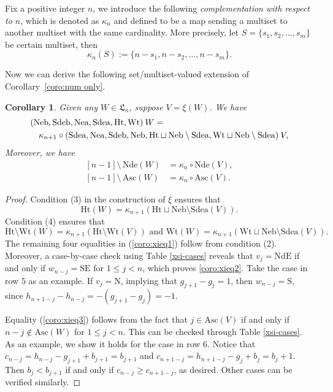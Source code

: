 \documentclass[12pt]{amsart}
\numberwithin{equation}{section}
\theoremstyle{plain}
\newtheorem{corollary}[theorem]{Corollary}
\theoremstyle{definition}
\def\LH{\mathfrak{L}}
\def\N{\mathrm{N}}
\def\S{\mathrm{S}}
\def\SE{\mathrm{SE}}
\def\NdE{\mathrm{NdE}}
\def\Neb{\mathrm{Neb}}
\def\Nea{\mathrm{Nea}}
\def\Sdeb{\mathrm{Sdeb}}
\def\Sdea{\mathrm{Sdea}}
\def\Nde{\mathrm{Nde}}
\def\Het{\mathrm{Ht}}
\def\Wt{\mathrm{Wt}}
\def\Asc{\mathrm{Asc}}
\begin{document}
Fix a positive integer $n$, we introduce the following {\em complementation with respect to $n$}, which is denoted as $\kappa_n$ and defined to be a map sending a multiset to another multiset with the same cardinality. More precisely, let $S=\{s_1,s_2,\ldots,s_m\}$ be certain multiset, then $$\kappa_n(S):=\{n-s_1,n-s_2,\ldots,n-s_m\}.$$

Now we can derive the following set/multiset-valued extension of Corollary~\ref{coro:num only}.

\begin{corollary}\label{coro:xi-stats}
Given any $W\in\LH_n$, suppose $V=\xi(W)$. We have
\begin{align}
&(\Neb,\Sdeb,\Nea,\Sdea,\Het,\Wt)\:W = \notag\\
& \quad \kappa_{n+1}\circ(\Sdea,\Nea,\Sdeb,\Neb,\Het\sqcup\Neb\setminus\Sdea,\Wt\sqcup\Neb\setminus\Sdea)\:V,
\label{coro:xieq1}
\end{align}
Moreover, we have
\begin{align}
\label{coro:xieq2}
[n-1] \setminus \,\Nde(W) &= \kappa_n\circ\Nde(V),\\
\label{coro:xieq3}
[n-1] \setminus \,\Asc(W) &= \kappa_n\circ\Asc(V).
\end{align}
\end{corollary}
\begin{proof}
Condition (3) in the construction of $\xi$ ensures that
$$\Het(W)=\kappa_{n+1}(\Het\sqcup\Neb\setminus\Sdea(V)).$$
Condition (4) ensures that
$$\Het\setminus\Wt(W)=\kappa_{n+1}(\Het\setminus\Wt(V)) \text{ and } \Wt(W)=\kappa_{n+1}(\Wt\sqcup\Neb\setminus\Sdea(V)).$$
The remaining four equalities in (\ref{coro:xieq1}) follow from condition (2). Moreover, a case-by-case check using Table \ref{xsi-cases} reveals that $v_j=\NdE$ if and only if $w_{n-j}=\SE$ for $1 \leq j <n$, which proves \eqref{coro:xieq2}. Take the case in row $5$ as an example. If $v_j=\N$, implying that $g_{j+1}-g_j=1$, then $w_{n-j}=\S$, since $h_{n+1-j}-h_{n-j}=-(g_{j+1}-g_j)=-1$.

Equality (\ref{coro:xieq3}) follows from the fact that
$j \in \Asc(V)$ if and only if $n-j \notin \Asc(W)$ for $1 \leq j <n$.
This can be  checked through Table \ref{xsi-cases}.
As an example, we show it holds for the case in row $6$. Notice that $c_{n-j}=h_{n-j}-g_{j+1}+b_{j+1}=b_{j+1}$
and $c_{n+1-j}=h_{n+1-j}-g_{j}+b_{j}=b_{j}+1$. Then $b_j < b_{j+1}$
if and only if  $c_{n-j} \geq c_{n+1-j}$, as desired. Other cases can be verified similarly.
\end{proof}
\end{document}
